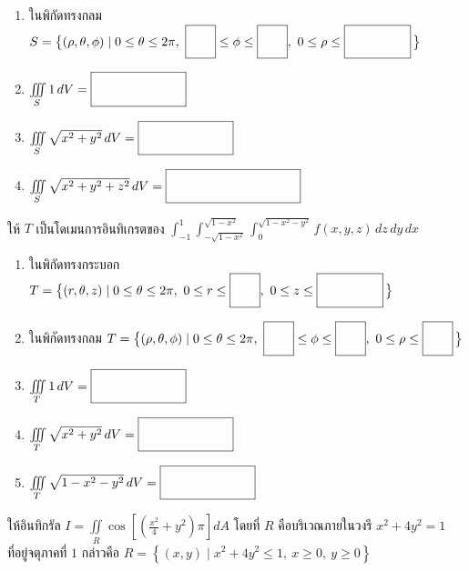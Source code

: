 \documentclass[12pt,final]{novelette} %
\begin{document}
\begin{question}
\begin{question}
\begin{enumerate}[label=(\alph*),itemsep=12pt,topsep=5pt]
            \item ในพิกัดทรงกลม \mbox{$S = \bigl\{(\rho, \theta, \phi) \mid 0 \leq \theta \leq 2\pi,\ \ansboxi{0.6cm} \leq \phi \leq \ansboxi{0.6cm},\ 0 \leq \rho \leq \ansboxi{1.6cm}\,\bigr\}$}

            \item $\iiint\limits_S 1 \, dV = \ansboxi{2.4cm}$

            \item $\iiint\limits_S \sqrt{x^2 + y^2} \, dV = \ansboxi{2.4cm}$

            \item $\iiint\limits_S \sqrt{x^2 + y^2 + z^2} \, dV = \ansboxi{3.5cm}$
        \end{enumerate}

        \vspace{4em}

        \item ให้ $T$ เป็นโดเมนการอินทิเกรตของ $\int_{-1}^1 \int_{-\sqrt{1-x^2}}^{\sqrt{1-x^2}} \int_0^{\sqrt{1-x^2-y^2}} f(x, y, z) \, dz \, dy \, dx$
        \begin{enumerate}[label=(\alph*),itemsep=12pt,topsep=5pt]
            \item ในพิกัดทรงกระบอก \mbox{$T = \bigl\{(r, \theta, z) \mid 0 \leq \theta \leq 2\pi,\ 0 \leq r \leq \ansboxi{0.6cm},\ 0 \leq z \leq \ansboxi{1.6cm}\,\bigr\}$}

            \item ในพิกัดทรงกลม $T = \bigl\{(\rho, \theta, \phi) \mid 0 \leq \theta \leq 2\pi,\ \ansboxi{0.6cm} \leq \phi \leq \ansboxi{0.6cm},\ 0 \leq \rho \leq \ansboxi{0.6cm}\,\bigr\}$

            \item $\iiint\limits_T 1 \, dV = \ansboxi{2.4cm}$

            \item $\iiint\limits_T \sqrt{x^2 + y^2} \, dV = \ansboxi{2.4cm}$

            \item $\iiint\limits_T \sqrt{1 - x^2 - y^2} \, dV = \ansboxi{2.4cm}$
        \end{enumerate}
    \end{question}

    \pagebreak

    \item {} %
     ให้อินทิกรัล $\displaystyle I = \iint\limits_R \cos \left[\left(\tfrac{x^2}{4} + y^2\right) \pi\right] dA$
    โดยที่ $R$ คือบริเวณภายในวงรี $x^2 + 4y^2 = 1$ \\ ที่อยู่จตุภาคที่ $1$
    กล่าวคือ $R = \left\{(x, y) \mid x^2 + 4y^2 \leq 1,\ x \geq 0,\ y \geq 0\right\}$


\end{question}
\end{document}
